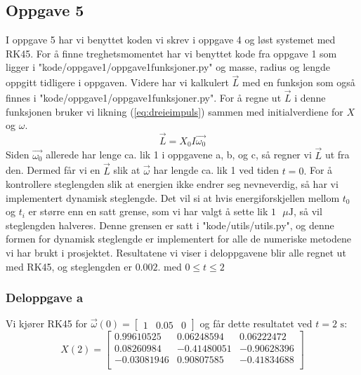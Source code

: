 \subsection{Oppgave 5}
I oppgave 5 har vi benyttet koden vi skrev i oppgave 4 og løst systemet med RK45. \newline\newline
For å finne treghetsmomentet har vi benyttet kode fra oppgave 1 som ligger i "kode/oppgave1/oppgave1funksjoner.py" og masse, radius og lengde oppgitt tidligere i oppgaven. Videre har vi kalkulert $\vec{L}$ med en funksjon som også finnes i "kode/oppgave1/oppgave1funksjoner.py". For å regne ut $\vec{L}$ i denne funksjonen bruker vi likning (\ref{eq:dreieimpuls}) sammen med initialverdiene for $X$ og $\omega.$
\begin{equation}
\vec{L} = X_0I\vec{\omega_0}
\end{equation}
Siden $\vec{\omega_0}$ allerede har lenge ca. lik 1 i oppgavene a, b, og c, så regner vi $\vec{L}$ ut fra den. Dermed får vi en $\vec{L}$ slik at $\vec{\omega}$ har lengde ca. lik 1 ved tiden $t=0.$\newline\newline
For å kontrollere steglengden slik at energien ikke endrer seg nevneverdig, så har vi implementert dynamisk steglengde. Det vil si at hvis energiforskjellen mellom $t_0$ og $t_{i}$ er større enn en satt grense, som vi har valgt å sette lik $1\text{ }\mu\text{J}$, så vil steglengden halveres. Denne grensen er satt i "kode/utils/utils.py", og denne formen for dynamisk steglengde er implementert for alle de numeriske metodene vi har brukt i prosjektet. Resultatene vi viser i deloppgavene blir alle regnet ut med RK45, og steglengden er $0.002.$ med $0\leq t \leq 2$
\subsubsection{Deloppgave a}
Vi kjører RK45 for $\vec{\omega}(0)=\begin{bmatrix}1&0.05&0\end{bmatrix}$ og får dette resultatet ved $t=2\text{ s}:$
\begin{equation}
X(2)=
\begin{bmatrix}
0.99610525 &  0.06248594 & 0.06222472\\
0.08260984 & -0.41480051 & -0.90628396\\
-0.03081946 & 0.90807585 & -0.41834688\\
\end{bmatrix}
\end{equation}
